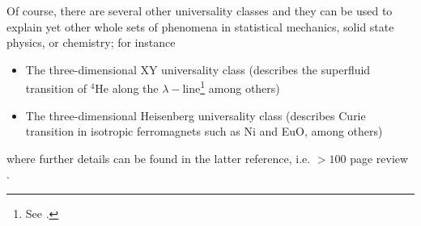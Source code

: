 \documentclass[12pt]{article}
\numberwithin{equation}{section}
\begin{document}
Of course, there are several other universality classes and they can be used to explain yet other whole sets of phenomena in statistical mechanics, solid state physics, or chemistry; for instance
\begin{itemize}
	\item The three-dimensional XY universality class (describes the superfluid transition of $^4$He along the $\lambda-$line\footnote{See \figref{\ref{fig: lambda line}}.} among others)
	\item The three-dimensional Heisenberg universality class (describes Curie transition in isotropic ferromagnets such as Ni and EuO, among others)
\end{itemize}
where further details can be found in the latter reference, i.e. $>100$ page review \cite{Pelissetto:2000ek}.
\end{document}
